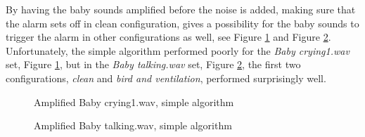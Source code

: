 By having the baby sounds amplified before the noise is added, making sure that
the alarm sets off in clean configuration, gives a possibility for the baby
sounds to trigger the alarm in other configurations as well, see Figure
\ref{fig:bc2_simp_amped} and Figure \ref{fig:bt_simp_amped}.  Unfortunately,
the simple algorithm performed poorly for the \emph{Baby crying1.wav}
set, Figure \ref{fig:bc2_simp_amped}, but in the \emph{Baby
talking.wav} set, Figure \ref{fig:bt_simp_amped}, the first two
configurations, \emph{clean} and \emph{bird and ventilation},
performed surprisingly well.

\begin{figure}[H]
  \centering
  \caption{Amplified Baby crying1.wav, simple algorithm}
  \label{fig:bc2_simp_amped}
\end{figure}
\begin{figure}[H]
  \centering
  \caption{Amplified Baby talking.wav, simple algorithm}
  \label{fig:bt_simp_amped}
\end{figure}

